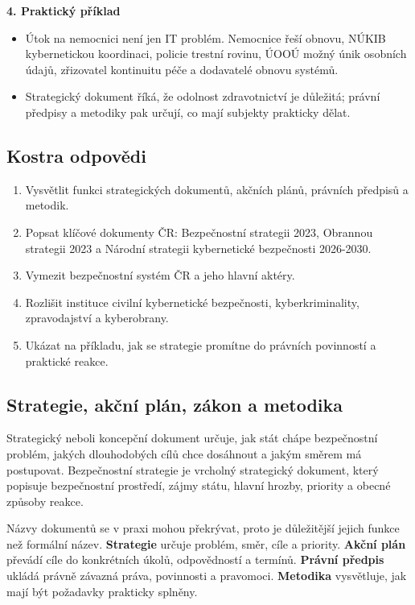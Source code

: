 \documentclass[11pt,a4paper]{article}
\begin{document}
\textbf{4. Praktický příklad}
\begin{itemize}
  \item Útok na nemocnici není jen IT problém. Nemocnice řeší obnovu, NÚKIB kybernetickou koordinaci, policie trestní rovinu, ÚOOÚ možný únik osobních údajů, zřizovatel kontinuitu péče a dodavatelé obnovu systémů.
  \item Strategický dokument říká, že odolnost zdravotnictví je důležitá; právní předpisy a metodiky pak určují, co mají subjekty prakticky dělat.
\end{itemize}

\subsection*{Kostra odpovědi}
\begin{enumerate}
  \item Vysvětlit funkci strategických dokumentů, akčních plánů, právních předpisů a metodik.
  \item Popsat klíčové dokumenty ČR: Bezpečnostní strategii 2023, Obrannou strategii 2023 a Národní strategii kybernetické bezpečnosti 2026-2030.
  \item Vymezit bezpečnostní systém ČR a jeho hlavní aktéry.
  \item Rozlišit instituce civilní kybernetické bezpečnosti, kyberkriminality, zpravodajství a kyberobrany.
  \item Ukázat na příkladu, jak se strategie promítne do právních povinností a praktické reakce.
\end{enumerate}

\subsection*{Strategie, akční plán, zákon a metodika}
Strategický neboli koncepční dokument určuje, jak stát chápe bezpečnostní problém, jakých dlouhodobých cílů chce dosáhnout a jakým směrem má postupovat. Bezpečnostní strategie je vrcholný strategický dokument, který popisuje bezpečnostní prostředí, zájmy státu, hlavní hrozby, priority a obecné způsoby reakce.

Názvy dokumentů se v praxi mohou překrývat, proto je důležitější jejich funkce než formální název. \textbf{Strategie} určuje problém, směr, cíle a priority. \textbf{Akční plán} převádí cíle do konkrétních úkolů, odpovědností a termínů. \textbf{Právní předpis} ukládá právně závazná práva, povinnosti a pravomoci. \textbf{Metodika} vysvětluje, jak mají být požadavky prakticky splněny.
\end{document}
